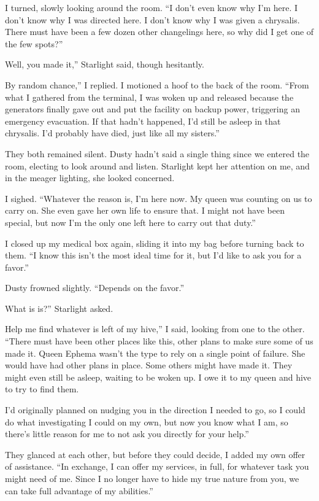 I turned, slowly looking around the room. “I don’t even know why I’m here. I don’t know why I was directed here. I don’t know why I was given a chrysalis. There must have been a few dozen other changelings here, so why did I get one of the few spots?”

\leavevmode{}Well, you made it,” Starlight said, though hesitantly.

\leavevmode{}By random chance,” I replied. I motioned a hoof to the back of the room. “From what I gathered from the terminal, I was woken up and released because the generators finally gave out and put the facility on backup power, triggering an emergency evacuation. If that hadn’t happened, I’d still be asleep in that chrysalis. I’d probably have died, just like all my sisters.”

They both remained silent. Dusty hadn’t said a single thing since we entered the room, electing to look around and listen. Starlight kept her attention on me, and in the meager lighting, she looked concerned.

I sighed. “Whatever the reason is, I’m here now. My queen was counting on us to carry on. She even gave her own life to ensure that. I might not have been special, but now I’m the only one left here to carry out that duty.”

I closed up my medical box again, sliding it into my bag before turning back to them. “I know this isn’t the most ideal time for it, but I’d like to ask you for a favor.”

Dusty frowned slightly. “Depends on the favor.”

\leavevmode{}What is is?” Starlight asked.

\leavevmode{}Help me find whatever is left of my hive,” I said, looking from one to the other. “There must have been other places like this, other plans to make sure some of us made it. Queen Ephema wasn’t the type to rely on a single point of failure. She would have had other plans in place. Some others might have made it. They might even still be asleep, waiting to be woken up. I owe it to my queen and hive to try to find them.

\leavevmode{}I’d originally planned on nudging you in the direction I needed to go, so I could do what investigating I could on my own, but now you know what I am, so there’s little reason for me to not ask you directly for your help.”

They glanced at each other, but before they could decide, I added my own offer of assistance. “In exchange, I can offer my services, in full, for whatever task you might need of me. Since I no longer have to hide my true nature from you, we can take full advantage of my abilities.”

